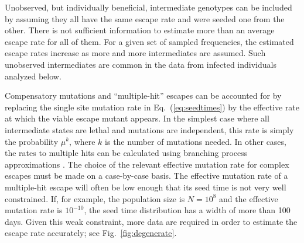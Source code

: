 \documentclass{frontiers}
\newcommand{\EQ}[1]{Eq.~(\ref{eq:#1})}
\newcommand{\FIG}[1]{Fig.~\ref{fig:#1}}
\begin{document}
Unobserved, but individually beneficial, intermediate genotypes can be included
by assuming they all have the same escape rate and were seeded one from the
other. There is not sufficient information to estimate more than an average
escape rate for all of them. For a given set of sampled frequencies,
the estimated escape rates increase as more and more intermediates
are assumed. Such unobserved intermediates are common in the data from infected
individuals analyzed below.

Compensatory mutations and ``multiple-hit'' escapes can be accounted for by
replacing the single site mutation rate in \EQ{seedtimes} by the effective rate at which the viable escape mutant
appears. In the simplest case where all intermediate
states are lethal and mutations are independent, this rate is simply the probability $\mu^k$,
where $k$ is the number of mutations needed. In other cases, the rates to
multiple hits can be calculated using branching process approximations
\citep{weissman_rate_2009,Neher:2011p42539}. The choice of the relevant
effective mutation rate for complex escapes must be made on a case-by-case
basis. The effective mutation rate of a multiple-hit escape will often be low
enough that its seed time is not very well constrained. If, for example, the
population size is $N=10^8$ and the effective mutation rate is $10^{-10}$, the
seed time distribution has a width of more than 100 days. Given this weak
constraint, more data are required in order to estimate the escape rate accurately; see
\FIG{degenerate}.
\end{document}
